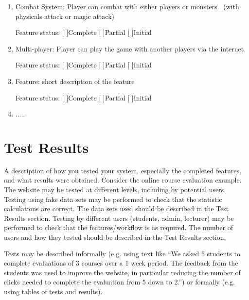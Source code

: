 \documentclass[12pt, a4paper]{report}
\begin{document}
\begin{enumerate}
	\item Combat System: Player can combat with either players or monsters.. (with physicals attack or magic attack) 

Feature status:   [ ]Complete\hspace*{1cm}     [ ]Partial\hspace*{1cm}    [ ]Initial


	\item Multi-player: Player can play the game with another players via the internet.
	
	
Feature status:   [ ]Complete\hspace*{1cm}     [ ]Partial\hspace*{1cm}    [ ]Initial

	\item Feature: short description of the feature
	
	
Feature status:   [ ]Complete\hspace*{1cm}     [ ]Partial\hspace*{1cm}    [ ]Initial

	\item .....
	

\end{enumerate}

\section{Test Results}
A description of how you tested your system, especially the completed features,  and what results were obtained. Consider the online course evaluation example. The website may be tested at different levels, including by potential users. Testing using fake data sets may be performed to check that the statistic calculations are correct. The data sets used should be described in the Test Results section. Testing by different users (students, admin, lecturer) may be performed to check that the features/workflow is as required. The number of users and how they tested should be described in the Test Results section.

Tests may be described informally (e.g. using text like “We asked 5 students to complete evaluations of 3 courses over a 1 week period. The feedback from the students was used to improve the website, in particular reducing the number of clicks needed to complete the evaluation from 5 down to 2.”) or formally (e.g. using tables of tests and results).
\end{document}
